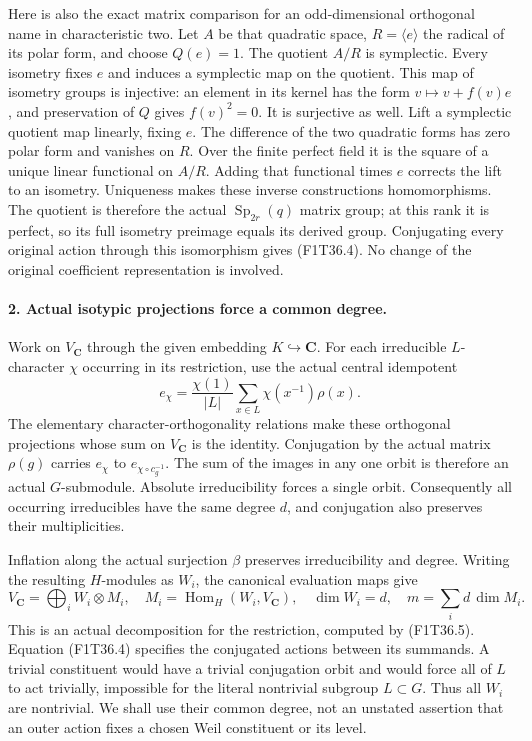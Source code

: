 Here is also the exact matrix comparison for
an odd-dimensional orthogonal name in
characteristic two. Let \(A\) be that quadratic
space, \(R=\langle e\rangle\) the radical of
its polar form, and choose \(Q(e)=1\).
The quotient \(A/R\) is symplectic.
Every isometry fixes \(e\) and induces a
symplectic map on the quotient. This map of
isometry groups is injective: an element in
its kernel has the form \(v\mapsto v+f(v)e\),
and preservation of \(Q\) gives \(f(v)^2=0\).
It is surjective as well. Lift a symplectic
quotient map linearly, fixing \(e\). The
difference of the two quadratic forms has
zero polar form and vanishes on \(R\).
Over the finite perfect field it is the
square of a unique linear functional on
\(A/R\). Adding that functional times \(e\)
corrects the lift to an isometry. Uniqueness
makes these inverse constructions
homomorphisms. The quotient is therefore
the actual \(\operatorname{Sp}_{2r}(q)\)
matrix group; at this rank it is perfect,
so its full isometry preimage equals its
derived group. Conjugating every original
action through this isomorphism gives
(F1T36.4). No change of the original
coefficient representation is involved.

\paragraph{2. Actual isotypic projections force a common degree.}
Work on \(V_{\mathbf C}\) through the given
embedding \(K\hookrightarrow\mathbf C\).
For each irreducible \(L\)-character
\(\chi\) occurring in its restriction, use
the actual central idempotent
\[
 e_\chi=\frac{\chi(1)}{|L|}
       \sum_{x\in L}\chi(x^{-1})\rho(x).
 \tag{F1T36.5}
\]
The elementary character-orthogonality
relations make these orthogonal projections
whose sum on \(V_{\mathbf C}\) is the
identity. Conjugation by the actual matrix
\(\rho(g)\) carries \(e_\chi\) to
\(e_{\chi\circ c_g^{-1}}\). The sum of the
images in any one orbit is therefore an
actual \(G\)-submodule. Absolute
irreducibility forces a single orbit.
Consequently all occurring irreducibles
have the same degree \(d\), and conjugation
also preserves their multiplicities.

Inflation along the actual surjection
\(\beta\) preserves irreducibility and degree.
Writing the resulting \(H\)-modules as
\(W_i\), the canonical evaluation maps give
\[
 V_{\mathbf C}
    =\bigoplus_i W_i\otimes M_i,
 \quad M_i=\operatorname{Hom}_H(W_i,V_{\mathbf C}),
 \quad \dim W_i=d,
 \quad m=\sum_i d\,\dim M_i.
 \tag{F1T36.6}
\]
This is an actual decomposition for the
restriction, computed by (F1T36.5).
Equation (F1T36.4) specifies the conjugated
actions between its summands. A trivial
constituent would have a trivial conjugation
orbit and would force all of \(L\) to act
trivially, impossible for the literal
nontrivial subgroup \(L\subset G\).
Thus all \(W_i\) are nontrivial.
We shall use their common degree, not an
unstated assertion that an outer action
fixes a chosen Weil constituent or its level.

